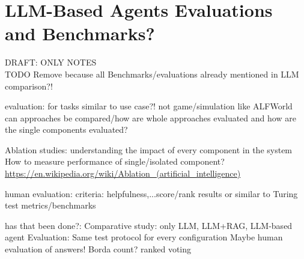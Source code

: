 \documentclass{article}
\begin{document}
%
%





\section{LLM-Based Agents Evaluations and Benchmarks?}
DRAFT: ONLY NOTES\\
TODO Remove because all Benchmarks/evaluations already mentioned in LLM comparison?!

evaluation: for tasks similar to use case?! not game/simulation like ALFWorld 
can approaches be compared/how are whole approaches evaluated and how are the single components evaluated?

Ablation studies: understanding the impact of every component in the system
How to measure performance of single/isolated component? \url{https://en.wikipedia.org/wiki/Ablation_(artificial_intelligence)}

human evaluation: criteria: helpfulness,...score/rank results
or similar to Turing test
metrics/benchmarks

has that been done?: Comparative study: only LLM, LLM+RAG, LLM-based agent
Evaluation: Same test protocol for every configuration
Maybe human evaluation of answers!
Borda count? ranked voting
\end{document}
